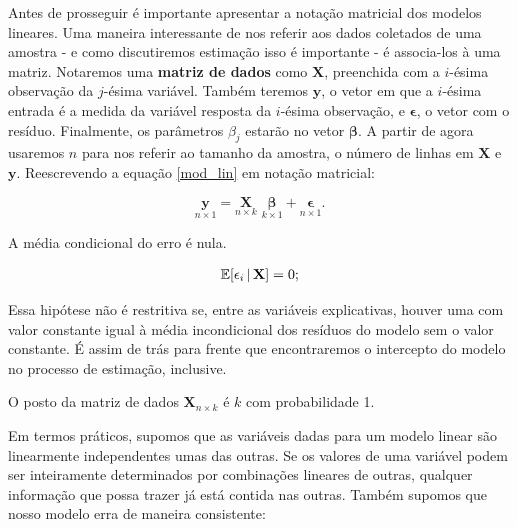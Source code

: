 Antes de prosseguir é importante apresentar a notação matricial dos modelos lineares. Uma maneira interessante de nos referir aos dados coletados de uma amostra - e como discutiremos estimação isso é importante - é associa-los à uma matriz. Notaremos uma \textbf{matriz de dados} como $\mathbf{X}$, preenchida com a $i$-ésima observação da $j$-ésima variável. Também teremos $\mathbf{y}$, o vetor em que a $i$-ésima entrada é a medida da variável resposta da $i$-ésima observação, e $\mathbf{\epsilon}$, o vetor com o resíduo. Finalmente, os parâmetros $\beta_j$ estarão no vetor $\boldsymbol{\beta}$. A partir de agora usaremos $n$ para nos referir ao tamanho da amostra, o número de linhas em $\mathbf{X}$ e $\mathbf{y}$. Reescrevendo a equação \ref{mod_lin} em notação matricial:

\begin{equation}
    \underset{n \times 1}{\mathbf{y}} = \underset{n \times k}{\mathbf{X}} \,\, \underset{k \times 1}{\boldsymbol{\beta}}   + \underset{n \times 1}{\boldsymbol{\epsilon}} .
\end{equation}



\begin{hipotese}
A média condicional do erro é nula.

\begin{align}
    \mathbb{E}[\epsilon_i \, | \, \mathbf{X}] = 0;
\end{align}

Essa hipótese não é restritiva se, entre as variáveis explicativas, houver uma com valor constante igual à média incondicional dos resíduos do modelo sem o valor constante. É assim de trás para frente que encontraremos o intercepto do modelo no processo de estimação, inclusive. 

\end{hipotese}

\begin{hipotese}
O posto da matriz de dados $\mathbf{X}_{n \times k}$ é $k$ com probabilidade 1.
\end{hipotese}

Em termos práticos, supomos que as variáveis dadas para um modelo linear são linearmente independentes umas das outras. Se os valores de uma variável podem ser inteiramente determinados por combinações lineares de outras, qualquer informação que possa trazer já está contida nas outras. Também supomos que nosso modelo erra de maneira consistente:


